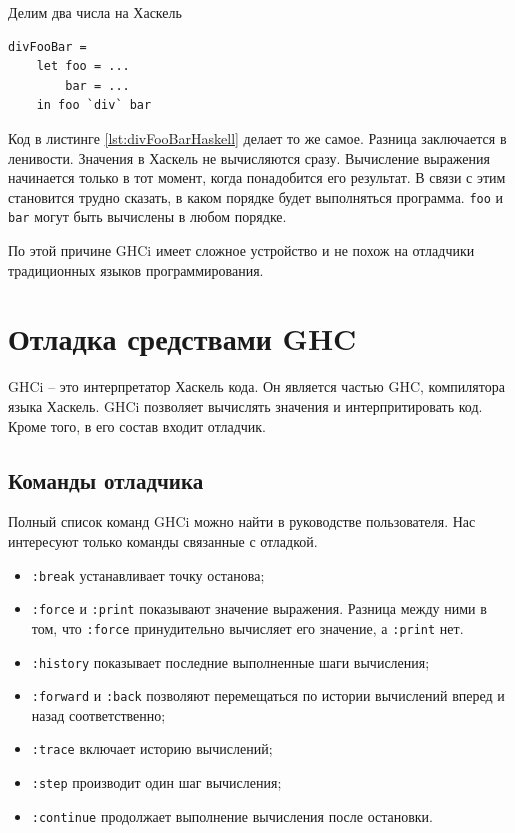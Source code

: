 \documentclass[fontsize=14pt, paper=a4, pagesize, DIV=calc]{scrartcl}
\def\code#1{\texttt{#1}}
\begin{document}
\begin{ListingEnv}
\caption{Делим два числа на Хаскель}
\label{lst:divFooBarHaskell}
\begin{lstlisting}
divFooBar =
    let foo = ...
        bar = ...
    in foo `div` bar
\end{lstlisting}
\end{ListingEnv}

Код в листинге \ref{lst:divFooBarHaskell} делает то же самое. Разница
заключается в ленивости. Значения в Хаскель не вычисляются сразу. Вычисление
выражения начинается только в тот момент, когда понадобится его результат. В
связи с этим становится трудно сказать, в каком порядке будет выполняться
программа. \code{foo} и \code{bar} могут быть вычислены в любом порядке.

По этой причине GHCi имеет сложное устройство и не похож на отладчики
традиционных языков программирования.

\section{Отладка средствами GHC}

GHCi -- это интерпретатор Хаскель кода. Он является частью GHC, компилятора
языка Хаскель. GHCi позволяет вычислять значения и интерпритировать код. Кроме
того, в его состав входит отладчик.

\subsection{Команды отладчика}

Полный список команд GHCi можно найти в руководстве пользователя\cite{manual}.
Нас интересуют только команды связанные с отладкой.

\begin{itemize}
\item \code{:break} устанавливает точку останова;
\item \code{:force} и \code{:print} показывают значение выражения. Разница между ними в
том, что \code{:force} принудительно вычисляет его значение, а \code{:print} нет.
\item \code{:history} показывает последние выполненные шаги вычисления;
\item \code{:forward} и \code{:back} позволяют перемещаться по истории
вычислений вперед и назад соответственно;
\item \code{:trace} включает историю вычислений;
\item \code{:step} производит один шаг вычисления;
\item \code{:continue} продолжает выполнение вычисления после остановки.
\end{itemize}
\end{document}

